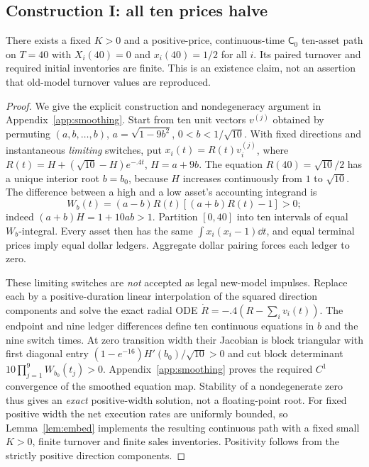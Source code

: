 \documentclass[review,hidelinks,onefignum,onetabnum]{siamonline250211}%
\begin{document}
\subsection{Construction I: all ten prices halve}\label{sec:conI}
\begin{theorem}\label{thm:tenhalf}
There exists a fixed $K>0$ and a positive-price, continuous-time
$\mathsf C_0$ ten-asset path on $T=40$ with
$X_i(40)=0$ and $x_i(40)=1/2$ for all $i$. Its paired turnover
and required initial inventories are finite. This is an existence
claim, not an assertion that old-model turnover values are reproduced.
\end{theorem}
\begin{proof}
We give the explicit construction and nondegeneracy argument in
Appendix~\ref{app:smoothing}. Start from ten unit vectors $v^{(j)}$
obtained by permuting $(a,b,\ldots,b)$,
$a=\sqrt{1-9b^2}$, $0<b<1/\sqrt{10}$.
With fixed directions and instantaneous \emph{limiting} switches,
put $x_i(t)=R(t)v_i^{(j)}$, where
$R(t)=H+(\sqrt{10}-H)e^{-.4t}$, $H=a+9b$.
The equation $R(40)=\sqrt{10}/2$ has a unique interior root $b=b_0$,
because $H$ increases continuously from $1$ to $\sqrt{10}$.
The difference between a high and a low asset's accounting integrand is
\[
 W_b(t)=(a-b)R(t)[(a+b)R(t)-1]>0;
\]
indeed $(a+b)H=1+10ab>1$. Partition $[0,40]$ into ten intervals
of equal $W_b$-integral. Every asset then has the same
$\int x_i(x_i-1)\dd t$, and equal terminal prices imply equal dollar
ledgers. Aggregate dollar pairing forces each ledger to zero.

These limiting switches are \emph{not} accepted as legal new-model
impulses. Replace each by a positive-duration linear interpolation
of the squared direction components and solve the exact radial ODE
$\dot R=-.4(R-\sum_i v_i(t))$. The endpoint and nine ledger
differences define ten continuous equations in $b$ and the nine
switch times. At zero transition width their Jacobian is block
triangular with first diagonal entry
$(1-e^{-16})H'(b_0)/\sqrt{10}>0$ and cut block determinant
$10\prod_{j=1}^9 W_{b_0}(t_j)>0$.
Appendix~\ref{app:smoothing} proves the required $C^1$ convergence
of the smoothed equation map. Stability of a nondegenerate zero
thus gives an \emph{exact} positive-width solution, not a
floating-point root. For fixed positive width the net execution rates
are uniformly bounded, so Lemma~\ref{lem:embed} implements the
resulting continuous path with a fixed small $K>0$, finite turnover
and finite sales inventories. Positivity follows from the strictly
positive direction components.
\end{proof}
\end{document}
